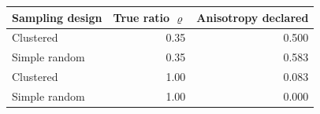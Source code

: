 \begin{tabular}{lrr}
\toprule
Sampling design & True ratio $\varrho$ & Anisotropy declared \\
\midrule
Clustered & 0.35 & 0.500 \\
Simple random & 0.35 & 0.583 \\
Clustered & 1.00 & 0.083 \\
Simple random & 1.00 & 0.000 \\
\bottomrule
\end{tabular}

